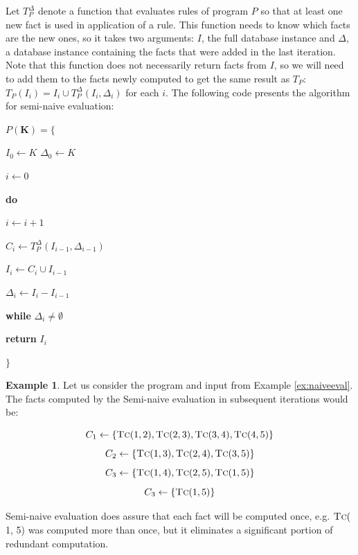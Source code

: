 \documentclass{pracamgr}
\theoremstyle{plain}
\theoremstyle{definition}
\newtheorem{exmp}{Example}[section]
\theoremstyle{remark}
\newcommand{\relat}[2]{$\textsc{#1}#2$}
\begin{document}
Let $T^\Delta_P$ denote a function that evaluates rules of program $P$ so that at least one new fact is used in application of a rule. This function needs to know which facts are the new ones, so it takes two arguments: $I$, the full database instance and $\Delta$, a database instance containing the facts that were added in the last iteration. Note that this function does not necessarily return facts from $I$, so we will need to add them to the facts newly computed to get the same result as $T_P$: $T_P(I_i) = I_i \cup T_P^\Delta(I_i, \Delta_i)$ for each $i$. The following code presents the algorithm for semi-naive evaluation: 


\parbox{0.5\textwidth}{
$P(\textbf{K}) = \{$

{\addtolength{\leftskip}{5mm}

$I_0 \leftarrow K$
$\Delta_0 \leftarrow K$

$i \leftarrow 0$

\textbf{do}

{\addtolength{\leftskip}{5mm}

$i \leftarrow i + 1$

$C_i \leftarrow T_P^\Delta(I_{i-1}, \Delta_{i-1})$

$I_i \leftarrow C_i \cup I_{i-1}$

$\Delta_i \leftarrow I_i - I_{i-1}$

}

\textbf{while} $\Delta_i \ne \emptyset$

\textbf{return} $I_i$

}

$\}$
}



\begin{exmp}
Let us consider the program and input from Example \ref{ex:naiveeval}. The facts computed by the Semi-naive evaluation in subsequent iterations would be:

$$C_1 \leftarrow \{\textsc{Tc}(1, 2), \textsc{Tc}(2, 3), \textsc{Tc}(3, 4), \textsc{Tc}(4, 5)\}$$
$$C_2 \leftarrow \{\textsc{Tc}(1, 3), \textsc{Tc}(2, 4), \textsc{Tc}(3, 5)\}$$
$$C_3 \leftarrow \{\textsc{Tc}(1, 4), \textsc{Tc}(2, 5), \textsc{Tc}(1, 5)\}$$
$$C_3 \leftarrow \{\textsc{Tc}(1, 5)\}$$
\end{exmp}\label{ex:semieval}

Semi-naive evaluation does assure that each fact will be computed once, e.g. \relat{Tc}(1, 5) was computed more than once, but it eliminates a significant portion of redundant computation.
\end{document}
